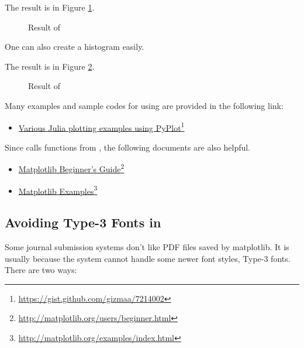 The result is in Figure \ref{fig:plot2}.

\begin{figure}
\caption{Result of  \label{fig:plot2}}
\end{figure}

One can also create a histogram easily.
\begin{codelisting}
\end{codelisting}

The result is in Figure \ref{fig:plot3}.

\begin{figure}
\caption{Result of  \label{fig:plot3}}
\end{figure}





Many examples and sample codes for using  are provided in the following link:
\begin{itemize}
\item \href{https://gist.github.com/gizmaa/7214002}{Various Julia plotting examples using PyPlot}\footnote{\url{https://gist.github.com/gizmaa/7214002}}
\end{itemize}
Since  calls functions from , the following documents are also helpful.
\begin{itemize}
\item \href{http://matplotlib.org/users/beginner.html}{Matplotlib Beginner's Guide}\footnote{\url{http://matplotlib.org/users/beginner.html}}
\item \href{http://matplotlib.org/examples/index.html}{Matplotlib Examples}\footnote{\url{http://matplotlib.org/examples/index.html}}
\end{itemize}









\subsection{Avoiding Type-3 Fonts in }

Some journal submission systems don't like PDF files saved by matplotlib. It is usually because the system cannot handle some newer font styles, Type-3 fonts. There are two ways:

